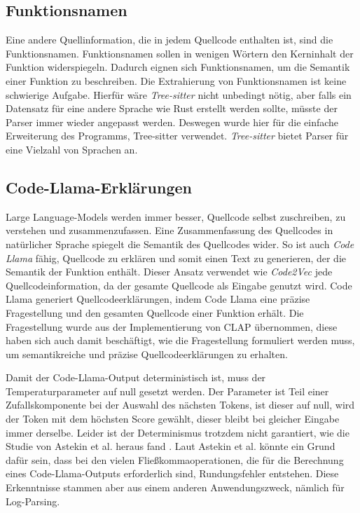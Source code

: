 \documentclass[12pt,letterpaper,ngerman]{article}
\begin{document}
\subsection{Funktionsnamen}
Eine andere Quellinformation, die in jedem Quellcode enthalten ist,
sind die Funktionsnamen. Funktionsnamen sollen in wenigen Wörtern 
den Kerninhalt der Funktion widerspiegeln. Dadurch eignen sich 
Funktionsnamen, um die Semantik einer Funktion zu beschreiben. 
Die Extrahierung von Funktionsnamen ist keine schwierige Aufgabe.
Hierfür wäre \textit{Tree-sitter} nicht unbedingt nötig, aber falls ein 
Datensatz für eine andere Sprache wie Rust erstellt werden sollte,
müsste der Parser immer wieder angepasst werden.
Deswegen wurde hier für die einfache Erweiterung des Programms,
Tree-sitter verwendet. \textit{Tree-sitter} bietet Parser für eine Vielzahl 
von Sprachen an.

\pagebreak

\subsection{Code-Llama-Erklärungen}
Large Language-Models werden immer besser, Quellcode selbst zuschreiben,
zu verstehen und zusammenzufassen. Eine Zusammenfassung des Quellcodes
in natürlicher Sprache spiegelt die Semantik des Quellcodes wider.
So ist auch \textit{Code Llama} fähig, Quellcode zu erklären und somit einen 
Text zu generieren, der die Semantik der Funktion enthält. Dieser 
Ansatz verwendet wie \textit{Code2Vec} jede Quellcodeinformation, da der 
gesamte Quellcode als Eingabe genutzt wird.
Code Llama generiert Quellcodeerklärungen, indem Code Llama eine präzise 
Fragestellung und den gesamten Quellcode einer Funktion erhält.
Die Fragestellung wurde aus der Implementierung von CLAP \cite{clap} übernommen, 
diese haben sich auch damit beschäftigt, wie die Fragestellung formuliert
werden muss, um semantikreiche und präzise Quellcodeerklärungen zu 
erhalten.

Damit der Code-Llama-Output deterministisch ist,
muss der Temperaturparameter auf null gesetzt werden. 
Der Parameter ist Teil einer Zufallskomponente bei der
Auswahl des nächsten Tokens, ist dieser auf null,
wird der Token mit dem höchsten Score gewählt, dieser 
bleibt bei gleicher Eingabe immer derselbe. Leider ist der
Determinismus trotzdem nicht garantiert, 
wie die Studie von Astekin et al. heraus fand
\cite{llmstable}. Laut Astekin et al. könnte ein Grund dafür sein,
dass bei den vielen Fließkommaoperationen, die für die Berechnung
eines Code-Llama-Outputs erforderlich sind,
Rundungsfehler entstehen. Diese Erkenntnisse stammen aber 
aus einem anderen Anwendungszweck, nämlich für Log-Parsing.
\end{document}
